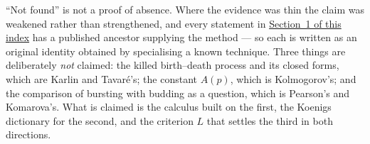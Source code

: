 
{\footnotesize\noindent
``Not found'' is not a proof of absence. Where the evidence was thin the claim was weakened
rather than strengthened, and every statement in \hyperref[oi:statements]{Section~1 of this index} has a published ancestor supplying
the method --- so each is written as an original identity obtained by specialising a known
technique. Three things are deliberately \emph{not} claimed: the killed birth--death process
and its closed forms, which are Karlin and Tavar\'e's; the constant $A(p)$, which is
Kolmogorov's; and the comparison of bursting with budding as a question, which is Pearson's
and Komarova's. What is claimed is the calculus built on the first, the Koenigs dictionary
for the second, and the criterion $L$ that settles the third in both directions.\par}


\endgroup
